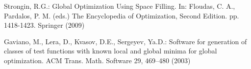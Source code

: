 \documentclass[smallcondensed]{svjour3}     %
\begin{document}
\begin{thebibliography}{}
Strongin, R.G.: Global Optimization Using Space Filling. In: Floudas, C. A., Pardalos, P. M. (eds.) The Encyclopedia of Optimization, Second Edition. pp. 1418-1423. Springer (2009)

Gaviano, M., Lera, D., Kvasov, D.E., Sergeyev, Ya.D.: Software for generation of classes of test functions with known local and global minima for global optimization. ACM Trans. Math. Software 29, 469--480 (2003)











\end{thebibliography}
\end{document}

